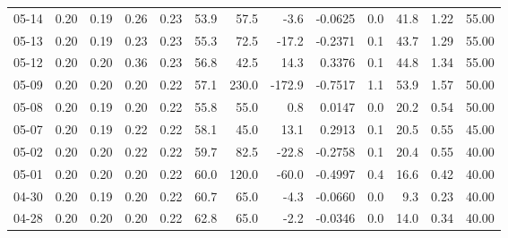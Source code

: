 \begin{threeparttable}
{\begin{tabular}{lrrrrrrrrrrrr}
  05-14 &          0.20 &          0.19 &          0.26 &        0.23 &                53.9 &                57.5 &       -3.6 &      -0.0625 &                 0.0 &             41.8 &            1.22 &                  55.00 \\
  05-13 &          0.20 &          0.19 &          0.23 &        0.23 &                55.3 &                72.5 &      -17.2 &      -0.2371 &                 0.1 &             43.7 &            1.29 &                  55.00 \\
  05-12 &          0.20 &          0.20 &          0.36 &        0.23 &                56.8 &                42.5 &       14.3 &       0.3376 &                 0.1 &             44.8 &            1.34 &                  55.00 \\
  05-09 &          0.20 &          0.20 &          0.20 &        0.22 &                57.1 &               230.0 &     -172.9 &      -0.7517 &                 1.1 &             53.9 &            1.57 &                  50.00 \\
  05-08 &          0.20 &          0.19 &          0.20 &        0.22 &                55.8 &                55.0 &        0.8 &       0.0147 &                 0.0 &             20.2 &            0.54 &                  50.00 \\
  05-07 &          0.20 &          0.19 &          0.22 &        0.22 &                58.1 &                45.0 &       13.1 &       0.2913 &                 0.1 &             20.5 &            0.55 &                  45.00 \\
  05-02 &          0.20 &          0.20 &          0.22 &        0.22 &                59.7 &                82.5 &      -22.8 &      -0.2758 &                 0.1 &             20.4 &            0.55 &                  40.00 \\
  05-01 &          0.20 &          0.20 &          0.20 &        0.22 &                60.0 &               120.0 &      -60.0 &      -0.4997 &                 0.4 &             16.6 &            0.42 &                  40.00 \\
  04-30 &          0.20 &          0.19 &          0.20 &        0.22 &                60.7 &                65.0 &       -4.3 &      -0.0660 &                 0.0 &              9.3 &            0.23 &                  40.00 \\
  04-28 &          0.20 &          0.20 &          0.20 &        0.22 &                62.8 &                65.0 &       -2.2 &      -0.0346 &                 0.0 &             14.0 &            0.34 &                  40.00 \\

\end{tabular}}
\end{threeparttable}
